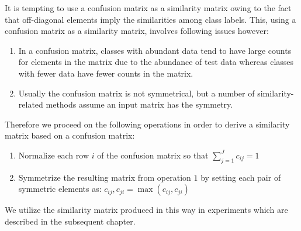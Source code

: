 It is tempting to use a confusion matrix as a similarity matrix owing to the fact that off-diagonal elements imply the similarities among class labels. This, using a confusion matrix as a similarity matrix, involves following issues however:
\begin{enumerate}
	\item In a confusion matrix, classes with abundant data tend to have large counts for elements in the matrix due to the abundance of test data whereas classes with fewer data have fewer counts in the matrix.
	\item Usually the confusion matrix is not symmetrical, but a number of similarity-related methods assume an input matrix has the symmetry.
\end{enumerate}

Therefore we proceed on the following operations in order to derive a similarity matrix based on a confusion matrix:
\begin{enumerate}
	\item Normalize each row $i$ of the confusion matrix so that $\sum_{j=1}^J c_{ij} = 1$
	\item Symmetrize the resulting matrix from operation $1$ by setting each pair of symmetric elements as: $c_{ij},c_{ji} = \max (c_{ij},c_{ji})$
\end{enumerate}

We utilize the similarity matrix produced in this way in experiments which are described in the subsequent chapter.
